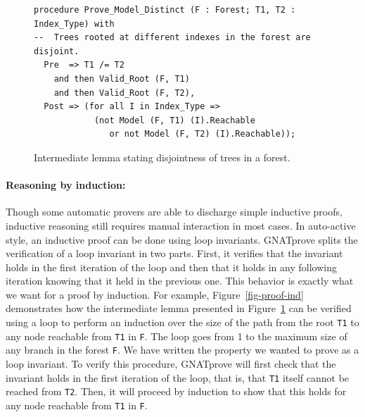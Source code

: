 \documentclass{llncs}
\newcommand{\gnatprove}{GNATprove\xspace}
\begin{document}
\begin{figure}
\vspace{-0.5cm}
\begin{small}
\begin{lstlisting}
procedure Prove_Model_Distinct (F : Forest; T1, T2 : Index_Type) with
--  Trees rooted at different indexes in the forest are disjoint.
  Pre  => T1 /= T2
    and then Valid_Root (F, T1)
    and then Valid_Root (F, T2),
  Post => (for all I in Index_Type =>
            (not Model (F, T1) (I).Reachable
               or not Model (F, T2) (I).Reachable));
\end{lstlisting}
\end{small}
\caption{\label{fig-proof-lem} Intermediate lemma stating disjointness of trees in a forest.}
\vspace{-0.5cm}
\end{figure}

\paragraph{Reasoning by induction:}
Though some automatic provers are able to discharge simple inductive proofs, inductive reasoning
still requires manual interaction in most cases. In auto-active style, an inductive proof can be done
using loop invariants. \gnatprove splits the
verification of a loop invariant in two parts. First, it verifies that the invariant holds in the first iteration of the
loop and then that it holds in any following iteration knowing that it held in the previous one.
This behavior is exactly what we want for a proof by induction. For example, Figure~\ref{fig-proof-ind}
demonstrates how the intermediate lemma presented in Figure~\ref{fig-proof-lem} can be verified
using a loop to perform an induction over the size of the path from the root \texttt{T1} to any node reachable
from \texttt{T1} in \texttt{F}. The loop goes from 1 to the maximum size of any branch
in the forest \texttt{F}. We have written the property we wanted to prove as a loop invariant. To verify this procedure, \gnatprove will
first check that the invariant holds in the first iteration of the loop, that is, that \texttt{T1} itself cannot
be reached from \texttt{T2}. Then, it will proceed by induction to show that this holds for any node reachable
from \texttt{T1} in \texttt{F}.
\end{document}
